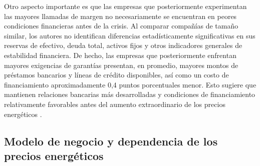 \documentclass{article} %
\begin{document}
    Otro aspecto importante es que las empresas que posteriormente experimentan las mayores llamadas de margen no necesariamente se encuentran en peores condiciones financieras antes de la crisis. Al comparar compañías de tamaño similar, los autores no identifican diferencias estadísticamente significativas en sus reservas de efectivo, deuda total, activos fijos y otros indicadores generales de estabilidad financiera. De hecho, las empresas que posteriormente enfrentan mayores exigencias de garantías presentan, en promedio, mayores montos de préstamos bancarios y líneas de crédito disponibles, así como un costo de financiamiento aproximadamente 0,4 puntos porcentuales menor. Esto sugiere que mantienen relaciones bancarias más desarrolladas y condiciones de financiamiento relativamente favorables antes del aumento extraordinario de los precios energéticos \parencite{GIANNOZZI2026107700}.

        
    \subsection{Modelo de negocio y dependencia de los precios energéticos}
\end{document}

